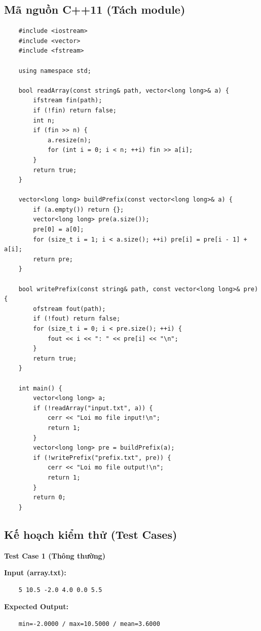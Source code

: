 \subsection{Mã nguồn C++11 (Tách module)}
    \begin{lstlisting}
    #include <iostream>
    #include <vector>
    #include <fstream>

    using namespace std;

    bool readArray(const string& path, vector<long long>& a) {
        ifstream fin(path);
        if (!fin) return false;
        int n;
        if (fin >> n) {
            a.resize(n);
            for (int i = 0; i < n; ++i) fin >> a[i];
        }
        return true;
    }

    vector<long long> buildPrefix(const vector<long long>& a) {
        if (a.empty()) return {};
        vector<long long> pre(a.size());
        pre[0] = a[0];
        for (size_t i = 1; i < a.size(); ++i) pre[i] = pre[i - 1] + a[i];
        return pre;
    }

    bool writePrefix(const string& path, const vector<long long>& pre) {
        ofstream fout(path);
        if (!fout) return false;
        for (size_t i = 0; i < pre.size(); ++i) {
            fout << i << ": " << pre[i] << "\n";
        }
        return true;
    }

    int main() {
        vector<long long> a;
        if (!readArray("input.txt", a)) {
            cerr << "Loi mo file input!\n";
            return 1;
        }
        vector<long long> pre = buildPrefix(a);
        if (!writePrefix("prefix.txt", pre)) {
            cerr << "Loi mo file output!\n";
            return 1;
        }
        return 0;
    }
\end{lstlisting}

\subsection{Kế hoạch kiểm thử (Test Cases)}

    \textbf{Test Case 1 (Thông thường)}

    \textbf{Input (array.txt):}
    \begin{lstlisting}
    5 10.5 -2.0 4.0 0.0 5.5\end{lstlisting}

    \textbf{Expected Output:}
    \begin{lstlisting}
    min=-2.0000 / max=10.5000 / mean=3.6000\end{lstlisting}

